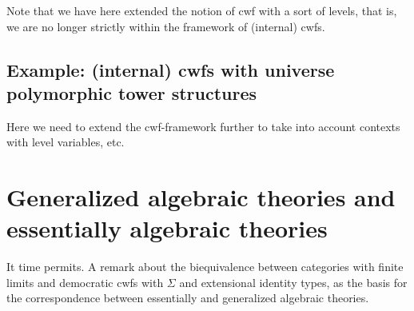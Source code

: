 \documentclass{lmcs}
\begin{document}
Note that we have here extended the notion of cwf with a sort of levels, that is, we are no longer strictly within the framework of (internal) cwfs.

\subsection{Example: (internal) cwfs with universe polymorphic tower structures} Here we need to extend the cwf-framework further to take into account contexts with level variables, etc.

\section{Generalized algebraic theories and essentially algebraic theories}

It time permits. A remark about the biequivalence between categories with finite limits and democratic cwfs with $\Sigma$ and extensional identity types, as the basis for the correspondence between essentially and generalized algebraic theories.
\end{document}
